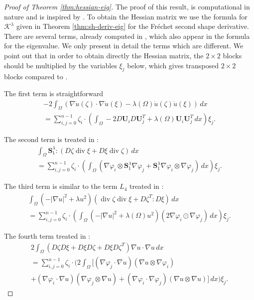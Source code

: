 \documentclass[11pt]{article}
\numberwithin{equation}{section}\newtheorem*{jepEnonce}{\jepEnonceTitle}\newenvironment{enonce*}[1]{\def\jepEnonceTitle{#1}\jepEnonce}{\endjepEnonce}\newtheorem*{conj*}{Conjecture}
\theoremstyle{plain}
\theoremstyle{definition}
\newcommand{\di}{\operatorname{div}}
\newcommand{\bo}[1]{{\boldsymbol#1}}
\begin{document}
\begin{proof}[Proof of Theorem \ref{thm:hessian-eig}]
The proof of this result, is computational in nature and is inspired by \cite[Prop.\,14]{laurain2ndDeriv}. To obtain the Hessian matrix we use the formula for $\mathcal K^\lambda$ given in Theorem \ref{thm:sh-deriv-eig} for the Fréchet second shape derivative. There are several terms, already computed in \cite[App.\,A]{laurain2ndDeriv}, which also appear in the formula for the eigenvalue. We only present in detail the terms which are different. We point out that in order to obtain directly the Hessian matrix, the $2\times 2$ blocks should be multiplied by the variables $\xi_j$ below, which gives transposed $2\times 2$ blocks compared to \cite{laurain2ndDeriv}.

The first term is straightforward
\vspace*{-5pt}
\begin{multline*}-2 \int_\Omega (\nabla \dot u(\zeta) \cdot \nabla \dot u(\xi) -\lambda(\Omega) \dot u(\zeta) \dot u(\xi))\, dx \\
= \sum_{i,j=0}^{n-1} \zeta_i \cdot \left(\int_\Omega -2D\bo U_i D\bo U_j^T + \lambda(\Omega)\bo U_i \bo U_j^T\, dx\right)\xi_j.
\end{multline*}

The second term is treated in \cite[term $L_3$, p.\,38]{laurain2ndDeriv}:
\vspace*{-5pt}
\begin{multline*} \int_{\Omega} \bo S_1^\lambda :(D\zeta \di \xi+D\xi \di \zeta)\, dx \\
= \sum_{i,j=0}^{n-1} \zeta_i\cdot \left(\int_\Omega \left(\nabla \varphi_i \otimes \bo S_1^\lambda \nabla \varphi_j + \bo S_1^\lambda \nabla \varphi_i \otimes \nabla \varphi_j\right) \, dx\right)\xi_j.
\end{multline*}

The third term is similar to the term $L_4$ treated in \cite[p.\,39]{laurain2ndDeriv}:
\vspace*{-5pt}
\begin{multline*}
\int_\Omega (-|\nabla u|^2+\lambda u^2)(\di \zeta \di \xi+D\zeta^T:D\xi)\, dx\\ =
\sum_{i,j=0}^{n-1} \zeta_i \cdot \left(\int_\Omega \left(-|\nabla u|^2+\lambda(\Omega) u^2\right) (2 \nabla \varphi_i \odot \nabla \varphi_j)\, dx \right) \xi_j.
\end{multline*}

The fourth term treated in \cite[$L_5$ p.\,39]{laurain2ndDeriv}:
\vspace*{-5pt}
\begin{multline*}
2\int_\Omega (D\zeta D\xi +D\xi D\zeta + D\xi D\zeta^T)\nabla u \cdot \nabla u\, dx \\= \sum_{i,j=0}^{n-1} \zeta_i \cdot \bigg(2\int_\Omega\big[ (\nabla \varphi_j\cdot \nabla u)(\nabla u \otimes \nabla \varphi_i)\\ +(\nabla \varphi_i \cdot \nabla u)(\nabla \varphi_j\otimes \nabla u) +(\nabla \varphi_i \cdot \nabla \varphi_j)(\nabla u \otimes \nabla u)\big] \, dx\bigg)\xi_j.
\end{multline*}


\end{proof}
\end{document}
